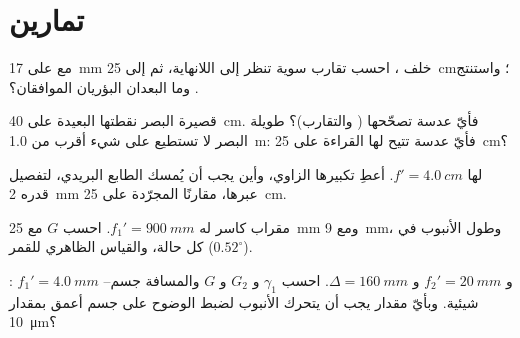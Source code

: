 \section{تمارين}

\begin{exercise}[$\star$]\label{exo:b1:optical-instruments:1}
مع  على \qty{17}{mm} خلف ، احسب تقارب
 سوية تنظر إلى اللانهاية، ثم إلى \qty{25}{cm}؛ واستنتج
. وما البعدان البؤريان الموافقان؟
\end{exercise}

\begin{exercise}[$\star$]\label{exo:b1:optical-instruments:2}
 قصيرة البصر نقطتها البعيدة على \qty{40}{cm}. فأيّ عدسة تصحّحها
( والتقارب)؟  طويلة البصر لا تستطيع  على شيء
أقرب من \qty{1.0}{m}: فأيّ عدسة تتيح لها القراءة على \qty{25}{cm}؟
\end{exercise}

\begin{exercise}[$\star$]\label{exo:b1:optical-instruments:3}
 لها $f' = \qty{4.0}{cm}$. أعطِ تكبيرها الزاوي،
وأين يجب أن يُمسك الطابع البريدي،  لتفصيل قدره \qty{2}{mm}
عبرها، مقارنًا  المجرّدة على \qty{25}{cm}.
\end{exercise}

\begin{exercise}[$\star$]\label{exo:b1:optical-instruments:4}
مقراب كاسر له $f_1' = \qty{900}{mm}$. احسب $G$ مع  \qty{25}{mm}
ومع  \qty{9}{mm}، وطول الأنبوب في كل حالة،
والقياس الظاهري للقمر ($0.52^\circ$).
\end{exercise}

\begin{exercise}[$\star\star$]\label{exo:b1:optical-instruments:5}
: $f_1' = \qty{4.0}{mm}$ و $f_2' = \qty{20}{mm}$ و
$\Delta = \qty{160}{mm}$. احسب $\gamma_1$ و $G_2$ و $G$ والمسافة
جسم--شيئية. وبأيّ مقدار يجب أن يتحرك الأنبوب لضبط الوضوح على
جسم أعمق بمقدار \qty{10}{\micro m}؟
\end{exercise}

